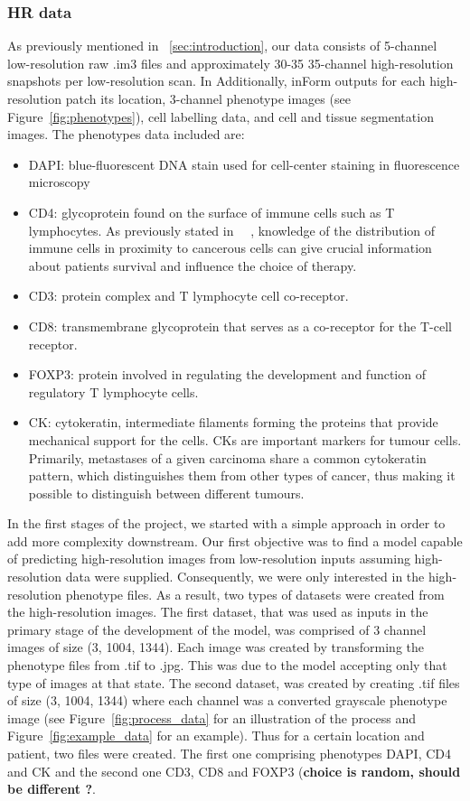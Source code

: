 \documentclass[11pt,conference,compsocconf]{IEEEtran}
\begin{document}
\subsubsection{HR data}\label{subsubsec:HR_data}
As previously mentioned in ~\ref{sec:introduction}, our data consists of 5-channel low-resolution raw .im3 files and approximately 30-35 35-channel high-resolution snapshots per low-resolution scan. In Additionally, inForm outputs for each high-resolution patch its location, 3-channel phenotype images (see Figure~\ref{fig:phenotypes}), cell labelling data, and cell and tissue segmentation images. The phenotypes data included are: 
\begin{itemize}
    \item DAPI: blue-fluorescent DNA stain used for cell-center staining in fluorescence microscopy
    \item CD4: glycoprotein found on the surface of immune cells such as T lymphocytes. As previously stated in ~\cite{Carstens2017}~\cite{Bottomley2019}, knowledge of the distribution of immune cells in proximity to cancerous cells can give crucial information about patients survival and influence the choice of therapy.
    \item CD3: protein complex and T lymphocyte cell co-receptor.
    \item CD8: transmembrane glycoprotein that serves as a co-receptor for the T-cell receptor.
    \item FOXP3: protein involved in regulating the development and function of regulatory T lymphocyte cells.
    \item CK: cytokeratin, intermediate filaments forming the proteins that provide mechanical support for the cells. CKs are important markers for tumour cells. Primarily, metastases of a given carcinoma share a common cytokeratin pattern, which distinguishes them from other types of cancer, thus making it possible to distinguish between different tumours.
\end{itemize} 

In the first stages of the project, we started with a simple approach in order to add more complexity downstream. Our first objective was to find a model capable of predicting high-resolution images from low-resolution inputs assuming high-resolution data were supplied. Consequently, we were only interested in the high-resolution phenotype files. As a result, two types of datasets were created from the high-resolution images. The first dataset, that was used as inputs in the primary stage of the development of the model, was comprised of 3 channel images of size (3, 1004, 1344). Each image was created by transforming the phenotype files from .tif to .jpg. This was due to the model accepting only that type of images at that state. The second dataset, was created by creating .tif files of size (3, 1004, 1344) where each channel was a converted grayscale phenotype image (see Figure~\ref{fig:process_data} for an illustration of the process and Figure~\ref{fig:example_data} for an example). Thus for a certain location and patient, two files were created. The first one comprising phenotypes DAPI, CD4 and CK and the second one CD3, CD8 and FOXP3 (\textbf{choice is random, should be different ?}.
\end{document}
